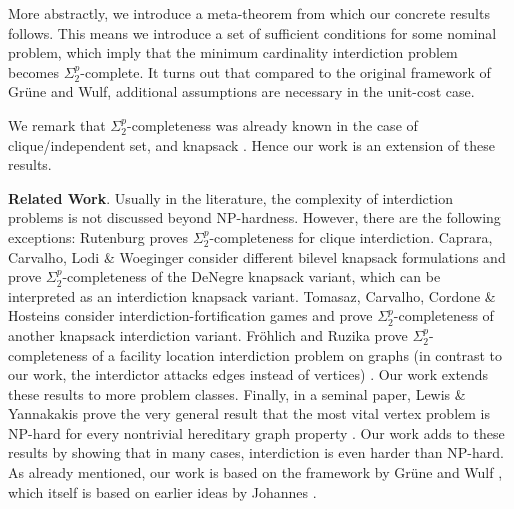 More abstractly, we introduce a meta-theorem from which our concrete results follows.
This means we introduce a set of sufficient conditions for some nominal problem, 
which imply that the minimum cardinality interdiction problem becomes $\Sigma^p_2$-complete.
It turns out that compared to the original framework of Grüne and Wulf, additional assumptions are necessary in the unit-cost case. 

We remark that $\Sigma^p_2$-completeness was already known in the case of clique/independent set, and knapsack \cite{DBLP:conf/ipco/CapraraCLW13,DBLP:journals/amai/Rutenburg93,DBLP:journals/corr/abs-2406-01756}. Hence our work is an extension of these results.

\textbf{Related Work}. Usually in the literature, the complexity of interdiction problems is not discussed beyond NP-hardness. 
However, there are the following exceptions: Rutenburg \cite{DBLP:journals/amai/Rutenburg93} proves $\Sigma^p_2$-completeness for clique interdiction. Caprara, Carvalho, Lodi \& Woeginger \cite{DBLP:conf/ipco/CapraraCLW13} consider different bilevel knapsack formulations and prove $\Sigma^p_2$-completeness of the DeNegre \cite{10.5555/2231641} knapsack variant, which can be interpreted as an interdiction knapsack variant.
Tomasaz, Carvalho, Cordone \& Hosteins \cite{DBLP:journals/corr/abs-2406-01756} consider interdiction-fortification games and prove $\Sigma^p_2$-completeness of another knapsack interdiction variant. 
Fröhlich and Ruzika prove $\Sigma^p_2$-completeness of a facility location interdiction problem on graphs
(in contrast to our work, the interdictor attacks edges instead of vertices) \cite[Section 4]{DBLP:journals/tcs/FrohlichR21}.
Our work extends these results to more problem classes.
Finally, in a seminal paper, Lewis \& Yannakakis prove the very general result that the most vital vertex problem is NP-hard for every nontrivial hereditary graph property \cite{DBLP:journals/jcss/LewisY80}.
Our work adds to these results by showing that in many cases, interdiction is even harder than NP-hard.
As already mentioned, our work is based on the framework by Grüne and Wulf \cite{gruene2024completeness}, which itself is based on earlier ideas by Johannes \cite{johannes2011new}.
